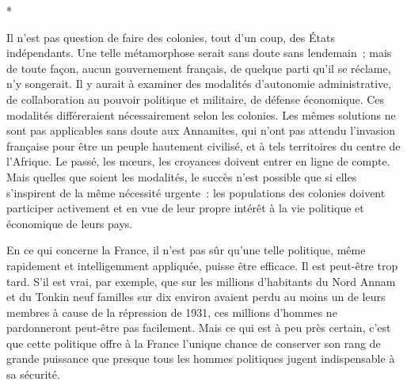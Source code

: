 \documentclass[french,twoside]{book} %
\begin{document}
\begin{center}
*\end{center}
\noindent Il n'est pas question de faire des colonies, tout d'un coup, des États indépendants. Une telle métamorphose serait sans doute sans lendemain ; mais de toute façon, aucun gouvernement français, de quelque parti qu'il se récla­me, n'y songerait. Il y aurait à examiner des modalités d'autonomie adminis­trative, de collaboration au pouvoir politique et militaire, de défense économique. Ces modalités différeraient nécessairement selon les colonies. Les mêmes solutions ne sont pas applicables sans doute aux Annamites, qui n'ont pas attendu l'invasion française pour être un peuple hautement civilisé, et à tels territoires du centre de l'Afrique. Le passé, les mœurs, les croyances doivent entrer en ligne de compte. Mais quelles que soient les modalités, le succès n'est possible que si elles s'inspirent de la même nécessité urgente : les populations des colonies doivent participer activement et en vue de leur propre intérêt à la vie politique et économique de leurs pays.\par
En ce qui concerne la France, il n'est pas sûr qu'une telle politique, même rapidement et intelligemment appliquée, puisse être efficace. Il est peut-être trop tard. S'il est vrai, par exemple, que sur les millions d'habitants du Nord Annam et du Tonkin neuf familles sur dix environ avaient perdu au moins un de leurs membres à cause de la répression de 1931, ces millions d'hommes ne pardonneront peut-être pas facilement. Mais ce qui est à peu près certain, c'est que cette politique offre à la France l'unique chance de conserver son rang de grande puissance que presque tous les hommes politiques jugent indispensable à sa sécurité.\par
\end{document}
